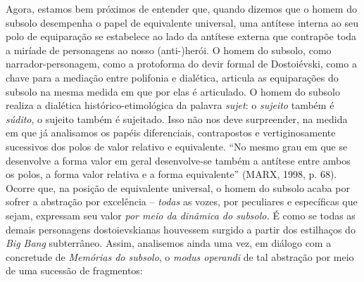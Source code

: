Agora, estamos bem próximos de entender que, quando dizemos que o homem
do subsolo desempenha o papel de equivalente universal, uma antítese
interna ao seu polo de equiparação se estabelece ao lado da antítese
externa que contrapõe toda a miríade de personagens ao nosso
(anti-)herói. O homem do subsolo, como narrador-personagem, como a
protoforma do devir formal de Dostoiévski, como a chave para a mediação
entre polifonia e dialética, articula as equiparações do subsolo na
mesma medida em que por elas é articulado. O homem do subsolo realiza a
dialética histórico-etimológica da palavra \emph{sujet}: o
\emph{sujeito} também é \emph{súdito}, o sujeito também é sujeitado.
Isso não nos deve surpreender, na medida em que já analisamos os papéis
diferenciais, contrapostos e vertiginosamente sucessivos dos polos de
valor relativo e equivalente. ``No mesmo grau em que se desenvolve a
forma valor em geral desenvolve-se também a antítese entre ambos os
polos, a forma valor relativa e a forma equivalente'' (MARX, 1998, p.
68). Ocorre que, na posição de equivalente universal, o homem do subsolo
acaba por sofrer a abstração por excelência -- \emph{todas} as vozes,
por peculiares e específicas que sejam, expressam seu valor \emph{por
meio da dinâmica do subsolo.} É como se todas as demais personagens
dostoievskianas houvessem surgido a partir dos estilhaços do \emph{Big
Bang} subterrâneo. Assim, analisemos ainda uma vez, em diálogo com a
concretude de \emph{Memórias do subsolo}, o \emph{modus operandi} de tal
abstração por meio de uma sucessão de fragmentos:

